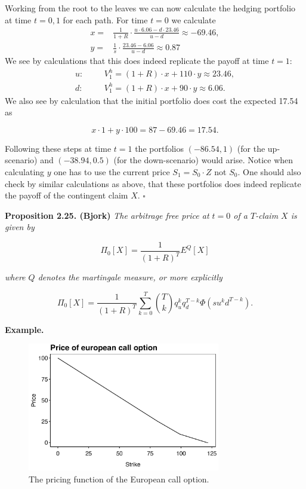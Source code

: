 \documentclass[
]{book}
\begin{document}
Working from the root to the leaves we can now calculate the hedging portfolio at time \(t=0,1\) for each path. For time \(t=0\) we calculate
\begin{align*}
x=&\frac{1}{1+R}\cdot \frac{u\cdot 6.06-d\cdot 23.46}{u-d}\approx -69.46,\\
y=&\frac{1}{s}\cdot\frac{23.46-6.06}{u-d}\approx0.87
\end{align*}
We see by calculations that this does indeed replicate the payoff at time \(t=1\):
\begin{align*}
u:\hspace{20pt}&V_1^h=(1+R)\cdot x + 110\cdot y\approx 23.46,\\
d:\hspace{20pt}&V_1^h=(1+R)\cdot x + 90\cdot y\approx 6.06.
\end{align*}
We also see by calculation that the initial portfolio does cost the expected 17.54 as

\[
x\cdot 1+y\cdot100=87-69.46=17.54.
\]

Following these steps at time \(t=1\) the portfolios \((-86.54,1)\) (for the up-scenario) and \((-38.94,0.5)\) (for the down-scenario) would arise. Notice when calculating \(y\) one has to use the current price \(S_1=S_0\cdot Z\) not \(S_0\). One should also check by similar calculations as above, that these portfolios does indeed replicate the payoff of the contingent claim \(X\). \(\square\)

\textbf{Proposition 2.25. (Bjork)} \emph{The arbitrage free price at \(t=0\) of a \(T\)-claim \(X\) is given by}

\[
\Pi_0[X]=\frac{1}{(1+R)^T}E^Q[X]
\]

\emph{where \(Q\) denotes the martingale measure, or more explicitly}

\[
\Pi_0[X]=\frac{1}{(1+R)^T}\sum_{k=0}^T\binom{T}{k}q_u^kq_d^{T-k}\Phi(su^kd^{T-k}).
\]

\textbf{Example.}

\begin{figure}[H]
  \begin{center}
    \includegraphics[width=0.75\textwidth]{figures/BS_call_price.png}
  \end{center}
  \caption{The pricing function of the European call option.}
\end{figure}
\end{document}
